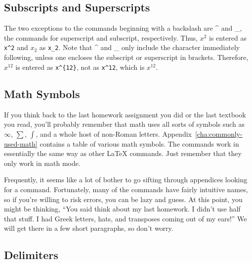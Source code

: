 \subsection{Subscripts and Superscripts}
\label{sec:subscr-superscr}

The two exceptions to the commands beginning with a backslash are \^{}
and \_, the commands for superscript and subscript, respectively.
Thus, $x^2$ is entered as \verb=x^2= and $x_2$ as \verb=x_2=.  Note
that \^{} and \_ only include the character immediately following,
unless one encloses the subscript or superscript in brackets.
Therefore, $x^{12}$ is entered as \verb=x^{12}=, not as \verb=x^12=,
which is $x^12$.

\subsection{Math Symbols}
\label{sec:math-symbols}

If you think back to the last homework assignment you did or the last
textbook you read, you'll probably remember that math uses all sorts
of symbols such as $\infty$, $\sum$, $\int$, and a whole host of
non-Roman letters.  Appendix~\ref{cha:commonly-used-math} contains a
table of various math symbols.  The commands work in essentially the
same way as other \LaTeX{} commands.  Just remember that they only
work in math mode.

Frequently, it seems like a lot of bother to go sifting through
appendices looking for a command.  Fortunately, many of the commands
have fairly intuitive names, so if you're willing to risk errors, you
can be lazy and guess.  At this point, you might be thinking, ``You
said think about my last homework.  I didn't use half that stuff.  I
had Greek letters, hats, and transposes coming out of my ears!''  We
will get there in a few short paragraphs, so don't worry.

\subsection{Delimiters}
\label{sec:delimiters}

